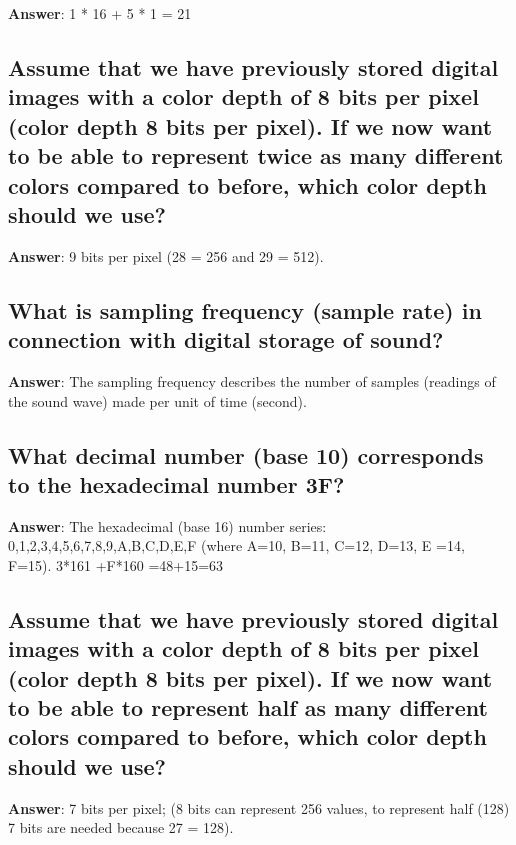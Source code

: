 \documentclass[a4paper,11pt,oneside]{article}
\begin{document}
\begin{sloppypar}
\textbf{Answer}: 1 * 16 + 5 * 1 = 21



\subsection{Assume that we have previously stored digital images with a color depth of 8 bits per pixel (color depth 8 bits per pixel). If we now want to be able to represent twice as many different colors compared to before, which color depth should we use?}

\label{q:76:sa:en:True}

\textbf{Answer}: 9 bits per pixel (28 = 256 and 29 = 512).



\subsection{What is sampling frequency (sample rate) in connection with digital storage of sound?}

\label{q:77:sa:en:True}

\textbf{Answer}: The sampling frequency describes the number of samples (readings of the sound wave) made per unit of time (second).



\subsection{What decimal number (base 10) corresponds to the hexadecimal number 3F?}

\label{q:78:sa:en:True}

\textbf{Answer}: The hexadecimal (base 16) number series: 0,1,2,3,4,5,6,7,8,9,A,B,C,D,E,F (where A=10, B=11, C=12, D=13, E =14, F=15). 3*161 +F*160 =48+15=63



\subsection{Assume that we have previously stored digital images with a color depth of 8 bits per pixel (color depth 8 bits per pixel). If we now want to be able to represent half as many different colors compared to before, which color depth should we use?}

\label{q:79:sa:en:True}

\textbf{Answer}: 7 bits per pixel; (8 bits can represent 256 values, to represent half (128) 7 bits are needed because 27 = 128).




\end{sloppypar}
\end{document}
